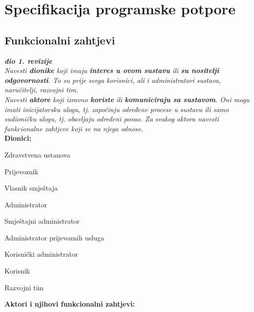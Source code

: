\chapter{Specifikacija programske potpore}
		
	\section{Funkcionalni zahtjevi}
			
			\textbf{\textit{dio 1. revizije}}\\
			
			\textit{Navesti \textbf{dionike} koji imaju \textbf{interes u ovom sustavu} ili  \textbf{su nositelji odgovornosti}. To su prije svega korisnici, ali i administratori sustava, naručitelji, razvojni tim.}\\
				
			\textit{Navesti \textbf{aktore} koji izravno \textbf{koriste} ili \textbf{komuniciraju sa sustavom}. Oni mogu imati inicijatorsku ulogu, tj. započinju određene procese u sustavu ili samo sudioničku ulogu, tj. obavljaju određeni posao. Za svakog aktora navesti funkcionalne zahtjeve koji se na njega odnose.}\\
			
			
			\noindent \textbf{Dionici:}
			
			\begin{packed_enum}
				
				\item Zdravstvena ustanova
				\item Prijevoznik			
				\item Vlasnik smještaja
				\item Administrator
				\begin{packed_enum}
					\item Smještajni administrator
					\item Administrator prijevoznih usluga
					\item Korisnički administrator
				\end{packed_enum}
				\item Korisnik
				\item Razvojni tim
				
			\end{packed_enum}
			\pagebreak
			
			\noindent \textbf{Aktori i njihovi funkcionalni zahtjevi:}
			
